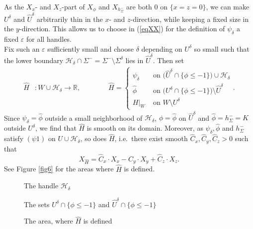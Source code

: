 \documentclass[a4paper,12pt,bibliography=totocnumbered,titlepage=false,abstracton,bookmarksnumbered=true]{scrartcl}
\newcommand{\veps}{\varepsilon}
\theoremstyle{definition}
\begin{document}
\begin{itemize}
As the $X_x$- and $X_z$-part of $X_\phi$ and $X_{h^-_\Sigma}$ are both 0 on $\{x=z=0\}$, we can make $U^\delta$ and $\hat{U}^\delta$ arbitrarily thin in the $x$- and $z$-direction, while keeping a fixed size in the $y$-direction. This allows us to choose in (\ref{eqXX}) for the definition of $\psi_\delta$ a fixed $\veps$ for all handles.\\
Fix such an $\veps$ sufficiently small and choose $\delta$ depending on $U^\delta$ so small such that the lower boundary $\mathcal{H}_\delta{\cap}\Sigma^-=\Sigma^-\setminus\Sigma^\delta$ lies in $\hat{U}^\delta$. Then set
\begin{align*}
 \hat{H}& : W\cup \mathcal{H}_\delta\rightarrow \mathbb{R},\qquad\qquad \hat{H}=
 \begin{cases}\psi_\delta & \text{ on }\big(\hat{U}^\delta\cap\{\phi{\leq}{-}1\}\big)\cup \mathcal{H}_\delta\\ 
 \hat{\phi} & \text{ on }\big(U^\delta\cap\{\phi{\leq}{-}1\}\big)\setminus \hat{U}^\delta\\
 H|_W & \text{ on }W\setminus U^\delta
\end{cases}.
\end{align*}
Since $\psi_\delta=\hat{\phi}$ outside a small neighborhood of $\mathcal{H}_\delta$, $\phi=\hat{\phi}$ on $\hat{U}^\delta$ and $\hat{\phi}=h_\Sigma^-=K$ outside $U^\delta$, we find that $\hat{H}$ is smooth on its domain. Moreover, as $\psi_\delta,\hat{\phi}$ and $h_\Sigma^-$ satisfy $(\psi1)$ on $U\cup \mathcal{H}_\delta$, so does $\hat{H}$, i.e.\ there exist smooth $\hat{C}_x,\hat{C}_y,\hat{C}_z>0$ such that
\[X_{\hat{H}}=\hat{C}_x{\cdot} X_x-\hat{C}_y{\cdot} X_y+\hat{C}_z{\cdot} X_z.\]
See Figure \ref{fig6} for the areas where $\hat{H}$ is defined.\pagebreak\\
\begin{figure}[ht]
\centering
\begin{minipage}[ht]{7cm}
 \resizebox{7cm}{!}{}
 \caption*{The handle $\mathcal{H}_\delta$}
 \end{minipage}
 \begin{minipage}[ht]{7cm}
  \resizebox{7cm}{!}{}
 \caption*{The sets $U^\delta\cap\{\phi\leq -1\}$ and $\hat{U}^\delta\cap\{\phi\leq -1\}$}
 \end{minipage}
\begin{minipage}[ht]{7cm}
 \resizebox{7cm}{!}{}
 \caption*{The area, where $\hat{H}$ is defined}
\end{minipage}
\begin{minipage}[ht]{7cm}

\end{minipage}
\end{figure}
\end{itemize}
\end{document}
